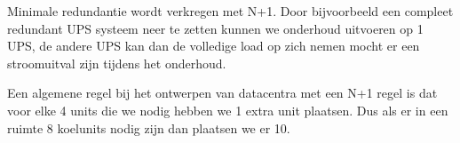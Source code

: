 Minimale redundantie wordt verkregen met N+1. Door bijvoorbeeld een compleet redundant UPS systeem neer te zetten kunnen we onderhoud uitvoeren op 1 UPS, de andere UPS kan dan de volledige load op zich nemen mocht er een stroomuitval zijn tijdens het onderhoud.

Een algemene regel bij het ontwerpen van datacentra met een N+1 regel is dat voor elke 4 units die we nodig hebben we 1 extra unit plaatsen. Dus als er in een ruimte 8 koelunits nodig zijn dan plaatsen we er 10.
